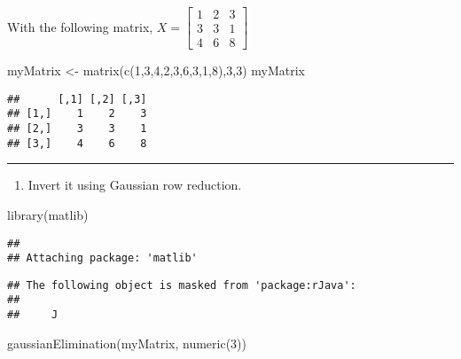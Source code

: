 \documentclass[
]{article}
\newenvironment{Shaded}{\begin{snugshade}}{\end{snugshade}}
\newcommand{\DecValTok}[1]{\textcolor[rgb]{0.00,0.00,0.81}{#1}}
\newcommand{\FunctionTok}[1]{\textcolor[rgb]{0.00,0.00,0.00}{#1}}
\newcommand{\NormalTok}[1]{#1}
\newcommand{\OtherTok}[1]{\textcolor[rgb]{0.56,0.35,0.01}{#1}}
\providecommand{\tightlist}{%
  \setlength{\itemsep}{0pt}\setlength{\parskip}{0pt}}
\begin{document}
With the following matrix,
\(X = \begin{bmatrix}1 & 2 & 3 \\ 3 & 3 & 1 \\ 4 & 6 & 8\end{bmatrix}\)

\begin{Shaded}
\begin{Highlighting}[]
\NormalTok{myMatrix }\OtherTok{\textless{}{-}} \FunctionTok{matrix}\NormalTok{(}\FunctionTok{c}\NormalTok{(}\DecValTok{1}\NormalTok{,}\DecValTok{3}\NormalTok{,}\DecValTok{4}\NormalTok{,}\DecValTok{2}\NormalTok{,}\DecValTok{3}\NormalTok{,}\DecValTok{6}\NormalTok{,}\DecValTok{3}\NormalTok{,}\DecValTok{1}\NormalTok{,}\DecValTok{8}\NormalTok{),}\DecValTok{3}\NormalTok{,}\DecValTok{3}\NormalTok{)}
\NormalTok{myMatrix}
\end{Highlighting}
\end{Shaded}

\begin{verbatim}
##      [,1] [,2] [,3]
## [1,]    1    2    3
## [2,]    3    3    1
## [3,]    4    6    8
\end{verbatim}

\begin{center}\rule{0.5\linewidth}{0.5pt}\end{center}

\begin{enumerate}
\def\labelenumi{\arabic{enumi}.}
\setcounter{enumi}{8}
\tightlist
\item
  Invert it using Gaussian row reduction.
\end{enumerate}

\begin{Shaded}
\begin{Highlighting}[]
\FunctionTok{library}\NormalTok{(matlib)}
\end{Highlighting}
\end{Shaded}

\begin{verbatim}
## 
## Attaching package: 'matlib'
\end{verbatim}

\begin{verbatim}
## The following object is masked from 'package:rJava':
## 
##     J
\end{verbatim}

\begin{Shaded}
\begin{Highlighting}[]
\FunctionTok{gaussianElimination}\NormalTok{(myMatrix, }\FunctionTok{numeric}\NormalTok{(}\DecValTok{3}\NormalTok{))}
\end{Highlighting}
\end{Shaded}
\end{document}
